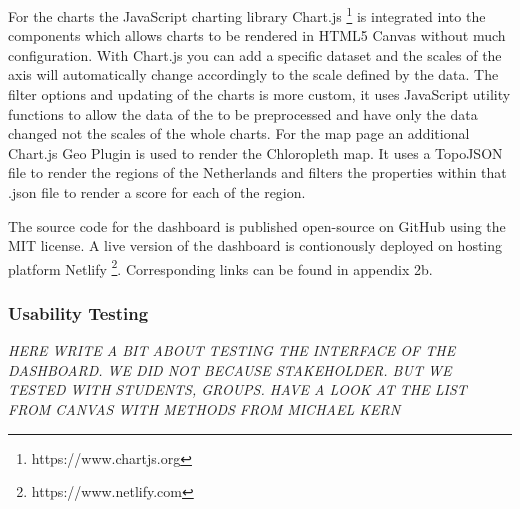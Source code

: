 For the charts the JavaScript charting library Chart.js \footnote{https://www.chartjs.org} is integrated into the components which allows charts to be rendered in HTML5 Canvas without much configuration. With Chart.js you can add a specific dataset and the scales of the axis will automatically change accordingly to the scale defined by the data. The filter options and updating of the charts is more custom, it uses JavaScript utility functions to allow the data of the to be preprocessed and have only the data changed not the scales of the whole charts. For the map page an additional Chart.js Geo Plugin is used to render the Chloropleth map. It uses a TopoJSON file to render the regions of the Netherlands and filters the properties within that .json file to render a score for each of the region.

The source code for the dashboard is published open-source on GitHub using the MIT license. A live version of the dashboard is contionously deployed on hosting platform Netlify \footnote{https://www.netlify.com}. Corresponding links can be found in appendix 2b.

\subsubsection {Usability Testing}\hfill

 \textit{HERE WRITE A BIT ABOUT TESTING THE INTERFACE OF THE DASHBOARD. WE DID NOT BECAUSE STAKEHOLDER. BUT WE TESTED WITH STUDENTS, GROUPS. HAVE A LOOK AT THE LIST FROM CANVAS WITH METHODS FROM MICHAEL KERN}